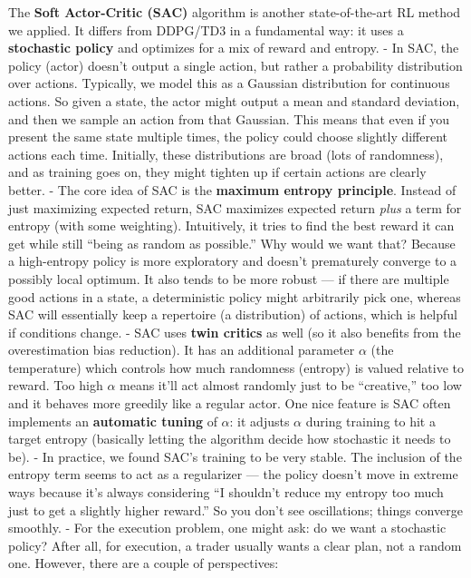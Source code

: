 \documentclass[11pt]{article}
\begin{document}
		The \textbf{Soft Actor-Critic (SAC)} algorithm is another state-of-the-art RL method we applied. It differs from DDPG/TD3 in a fundamental way: it uses a \textbf{stochastic policy} and optimizes for a mix of reward and entropy.
		- In SAC, the policy (actor) doesn’t output a single action, but rather a probability distribution over actions. Typically, we model this as a Gaussian distribution for continuous actions. So given a state, the actor might output a mean and standard deviation, and then we sample an action from that Gaussian. This means that even if you present the same state multiple times, the policy could choose slightly different actions each time. Initially, these distributions are broad (lots of randomness), and as training goes on, they might tighten up if certain actions are clearly better. 
		- The core idea of SAC is the \textbf{maximum entropy principle}. Instead of just maximizing expected return, SAC maximizes expected return \emph{plus} a term for entropy (with some weighting). Intuitively, it tries to find the best reward it can get while still “being as random as possible.” Why would we want that? Because a high-entropy policy is more exploratory and doesn’t prematurely converge to a possibly local optimum. It also tends to be more robust — if there are multiple good actions in a state, a deterministic policy might arbitrarily pick one, whereas SAC will essentially keep a repertoire (a distribution) of actions, which is helpful if conditions change.
		- SAC uses \textbf{twin critics} as well (so it also benefits from the overestimation bias reduction). It has an additional parameter $\alpha$ (the temperature) which controls how much randomness (entropy) is valued relative to reward. Too high $\alpha$ means it’ll act almost randomly just to be “creative,” too low and it behaves more greedily like a regular actor. One nice feature is SAC often implements an \textbf{automatic tuning} of $\alpha$: it adjusts $\alpha$ during training to hit a target entropy (basically letting the algorithm decide how stochastic it needs to be).
		- In practice, we found SAC’s training to be very stable. The inclusion of the entropy term seems to act as a regularizer — the policy doesn’t move in extreme ways because it’s always considering “I shouldn’t reduce my entropy too much just to get a slightly higher reward.” So you don’t see oscillations; things converge smoothly.
		- For the execution problem, one might ask: do we want a stochastic policy? After all, for execution, a trader usually wants a clear plan, not a random one. However, there are a couple of perspectives:
\end{document}
